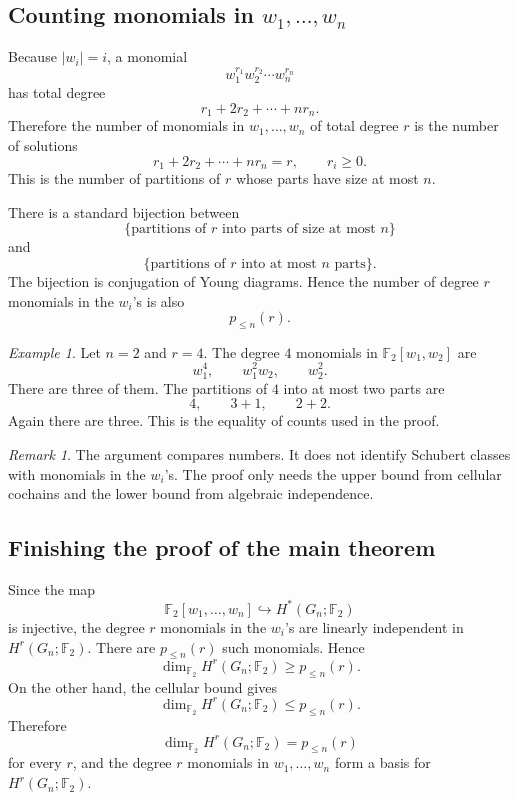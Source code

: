 \documentclass[11pt]{article}
\theoremstyle{remark}
\newtheorem{remark}[theorem]{Remark}
\newtheorem{example}[theorem]{Example}
\newcommand{\F}{\mathbb F}
\newcommand{\Gn}{G_n}
\begin{document}
\subsection{Counting monomials in $w_1,\dots,w_n$}

Because $|w_i|=i$, a monomial
\[
  w_1^{r_1}w_2^{r_2}\cdots w_n^{r_n}
\]
has total degree
\[
  r_1+2r_2+\cdots+nr_n.
\]
Therefore the number of monomials in $w_1,\dots,w_n$ of total degree $r$ is the number of solutions
\[
  r_1+2r_2+\cdots+nr_n=r,
  \qquad r_i\ge 0.
\]
This is the number of partitions of $r$ whose parts have size at most $n$.

There is a standard bijection between
\[
  \{\text{partitions of $r$ into parts of size at most $n$}\}
\]
and
\[
  \{\text{partitions of $r$ into at most $n$ parts}\}.
\]
The bijection is conjugation of Young diagrams.  Hence the number of degree $r$ monomials in the $w_i$'s is also
\[
  p_{\le n}(r).
\]

\begin{example}
Let $n=2$ and $r=4$.  The degree $4$ monomials in $\F_2[w_1,w_2]$ are
\[
  w_1^4,
  \qquad w_1^2w_2,
  \qquad w_2^2.
\]
There are three of them.  The partitions of $4$ into at most two parts are
\[
  4,
  \qquad 3+1,
  \qquad 2+2.
\]
Again there are three.  This is the equality of counts used in the proof.
\end{example}

\begin{remark}
The argument compares numbers.  It does not identify Schubert classes with monomials in the $w_i$'s.  The proof only needs the upper bound from cellular cochains and the lower bound from algebraic independence.
\end{remark}

\subsection{Finishing the proof of the main theorem}

Since the map
\[
  \F_2[w_1,\dots,w_n]\hookrightarrow H^*(\Gn;\F_2)
\]
is injective, the degree $r$ monomials in the $w_i$'s are linearly independent in $H^r(\Gn;\F_2)$.  There are $p_{\le n}(r)$ such monomials.  Hence
\[
  \dim_{\F_2}H^r(\Gn;\F_2)
  \ge p_{\le n}(r).
\]
On the other hand, the cellular bound gives
\[
  \dim_{\F_2}H^r(\Gn;\F_2)
  \le p_{\le n}(r).
\]
Therefore
\[
  \dim_{\F_2}H^r(\Gn;\F_2)=p_{\le n}(r)
\]
for every $r$, and the degree $r$ monomials in $w_1,\dots,w_n$ form a basis for $H^r(\Gn;\F_2)$.
\end{document}
